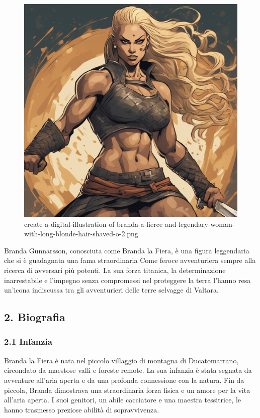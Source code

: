 \begin{figure}
\centering
\includegraphics{create-a-digital-illustration-of-branda-a-fierce-and-legendary-woman-with-long-blonde-hair-shaved-o-2.png}
\caption{create-a-digital-illustration-of-branda-a-fierce-and-legendary-woman-with-long-blonde-hair-shaved-o-2.png}
\end{figure}

Branda Gunnarsson, conosciuta come Branda la Fiera, è una figura
leggendaria che si è guadagnata una fama straordinaria Come feroce
avventuriera sempre alla ricerca di avversari più potenti. La sua forza
titanica, la determinazione inarrestabile e l'impegno senza compromessi
nel proteggere la terra l'hanno resa un'icona indiscussa tra gli
avventurieri delle terre selvagge di Valtara.

\subsection{2. Biografia}\label{biografia}


\subsubsection{2.1 Infanzia}\label{infanzia}


Branda la Fiera è nata nel piccolo villaggio di montagna di
Ducatomarrano, circondato da maestose valli e foreste remote. La sua
infanzia è stata segnata da avventure all'aria aperta e da una profonda
connessione con la natura. Fin da piccola, Branda dimostrava una
straordinaria forza fisica e un amore per la vita all'aria aperta. I
suoi genitori, un abile cacciatore e una maestra tessitrice, le hanno
trasmesso preziose abilità di sopravvivenza.

